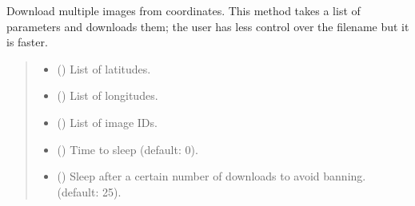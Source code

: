 \documentclass[letterpaper,10pt,english]{sphinxmanual}
\begin{document}

\begin{fulllineitems}
\label{\detokenize{index:gebot.ImageDownloader.download_images}}
\pysigstartsignatures
{}
\pysigstopsignatures
\sphinxAtStartPar
Download multiple images from coordinates. This method takes a list of parameters and downloads them; the user has less control over the filename but it is faster.
\begin{quote}\begin{description}
\begin{itemize}
\item {} 
\sphinxAtStartPar
{} () \textendash{} List of latitudes.

\item {} 
\sphinxAtStartPar
{} () \textendash{} List of longitudes.

\item {} 
\sphinxAtStartPar
{} () \textendash{} List of image IDs.

\item {} 
\sphinxAtStartPar
{} (\sphinxstyleliteralemphasis{\sphinxupquote{, }}) \textendash{} Time to sleep (default: 0).

\item {} 
\sphinxAtStartPar
{} (\sphinxstyleliteralemphasis{\sphinxupquote{, }}) \textendash{} Sleep after a certain number of downloads to avoid banning. (default: 25).

\end{itemize}

\end{description}\end{quote}

\end{fulllineitems}
\end{document}
